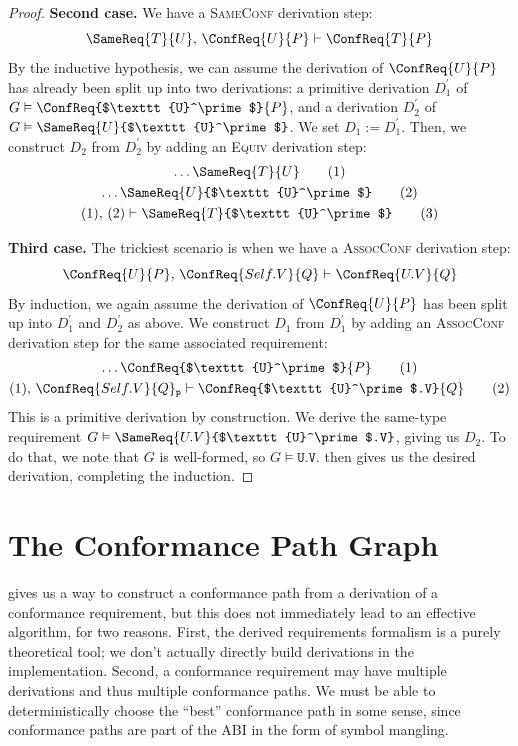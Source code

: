 \documentclass[../generics]{subfiles}
\begin{document}
\begin{proof}
\noindent \textbf{Second case.} We have a \textsc{SameConf} derivation step:
\[\SameReq{T}{U},\,\ConfReq{U}{P}\vdash\ConfReq{T}{P}\]
By the inductive hypothesis, we can assume the derivation of $\ConfReq{U}{P}$ has already been split up into two derivations: a primitive derivation $D_1^\prime$ of $G\vDash\ConfReq{$\texttt{U}^\prime$}{P}$, and a derivation $D_2^\prime$ of $G\vDash\SameReq{U}{$\texttt{U}^\prime$}$. We set $D_1:=D_1^\prime$. Then, we construct $D_2$ from $D_2^\prime$ by adding an \textsc{Equiv} derivation step:
\begin{gather*}
\ldots\SameReq{T}{U}\tag{1}\\
\ldots\SameReq{U}{$\texttt{U}^\prime$}\tag{2}\\
(1),\,(2)\vdash\SameReq{T}{$\texttt{U}^\prime$}\tag{3}
\end{gather*}

\noindent \textbf{Third case.} The trickiest scenario is when we have a \textsc{AssocConf} derivation step:
\[\ConfReq{U}{P},\,\ConfReq{Self.V}{Q}\vdash\ConfReq{U.V}{Q}\]
By induction, we again assume the derivation of $\ConfReq{U}{P}$ has been split up into $D_1^\prime$ and $D_2^\prime$ as above. We construct $D_1$ from $D_1^\prime$ by adding an \textsc{AssocConf} derivation step for the same associated requirement:
\begin{gather*}
\ldots\ConfReq{$\texttt{U}^\prime$}{P}\tag{1}\\
(1),\,\ConfReq{Self.V}{Q}_\texttt{P}\vdash\ConfReq{$\texttt{U}^\prime$.V}{Q}\tag{2}
\end{gather*}
This is a primitive derivation by construction. We derive the same-type requirement $G\vDash\SameReq{U.V}{$\texttt{U}^\prime$.V}$, giving us $D_2$. To do that, we note that $G$ is well-formed, so $G\vDash\texttt{U.V}$.  then gives us the desired derivation, completing the induction.
\end{proof}

\section{The Conformance Path Graph}\label{finding conformance paths}

 gives us a way to construct a conformance path from a derivation of a conformance requirement, but this does not immediately lead to an effective algorithm, for two reasons. First, the derived requirements formalism is a purely theoretical tool; we don't actually directly build derivations in the implementation. Second, a conformance requirement may have multiple derivations and thus multiple conformance paths. We must be able to deterministically choose the ``best'' conformance path in some sense, since conformance paths are part of the ABI in the form of symbol mangling.
\end{document}
